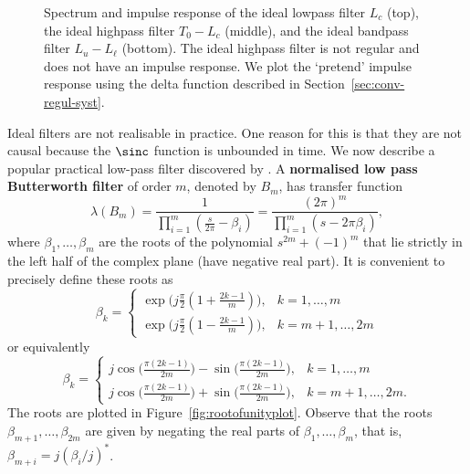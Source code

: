 \documentclass[11pt,a4paper]{book}
\theoremstyle{plain}
\numberwithin{equation}{section}
\newcommand{\term}{\textbf}
\newcommand{\vtick}[1]{\draw (#1,-0.075) -- (#1,0.075) }
\newcommand{\htick}[1]{\draw (-0.075,#1) -- (0.075,#1)}
\begin{document}
\begin{figure}[p]
\;\;
\caption{Spectrum and impulse response of the ideal lowpass filter $L_c$ (top), the ideal highpass filter $T_0 - L_c$ (middle), and the ideal bandpass filter $L_u - L_\ell$ (bottom).  The ideal highpass filter is not regular and does not have an impulse response.  We plot the `pretend' impulse response using the delta function described in Section~\ref{sec:conv-regul-syst}.} \label{fig:idealfilters}
\end{figure}


Ideal filters are not realisable in practice.  One reason for this is that they are not causal because the $\sinc$ function is unbounded in time.  We now describe a popular practical low-pass filter discovered by \citet{Butterworth1930}.  A \term{normalised low pass Butterworth filter} of order $m$, denoted by $B_m$, has transfer function
\[
\lambda(B_m) = \frac{1}{\prod_{i=1}^m(\tfrac{s}{2\pi} - \beta_i)} = \frac{(2\pi)^m}{\prod_{i=1}^m(s - 2\pi\beta_i)},
\] 
where $\beta_1,\dots,\beta_m$ are the roots of the polynomial $s^{2m} + (-1)^m$ that lie strictly in the left half of the complex plane (have negative real part).  It is convenient to precisely define these roots as
\[
\beta_{k} = \begin{cases}
\exp\big(j\tfrac{\pi}{2}( 1 + \tfrac{2k-1}{m} )\big) , & k = 1, \dots, m \\
\exp\big(j\tfrac{\pi}{2}( 1 - \tfrac{2k-1}{m} )\big) , & k = m+1, \dots, 2m
\end{cases}
\]
or equivalently
\[
\beta_k= \begin{cases}
j \cos\big(\tfrac{\pi(2k-1)}{2m}\big) -\sin\big(\tfrac{\pi(2k-1)}{2m}\big), & k = 1, \dots, m \\
j \cos\big(\tfrac{\pi(2k-1)}{2m}\big) + \sin\big(\tfrac{\pi(2k-1)}{2m}\big) , & k = m+1, \dots, 2m.
\end{cases}
\]
The roots are plotted in Figure~\ref{fig:rootofunityplot}.  Observe that the roots $\beta_{m+1},\dots,\beta_{2m}$ are given by negating the real parts of $\beta_1,\dots,\beta_m$, that is, $\beta_{m+i} = j (\beta_{i}/j)^*$.
\end{document}
